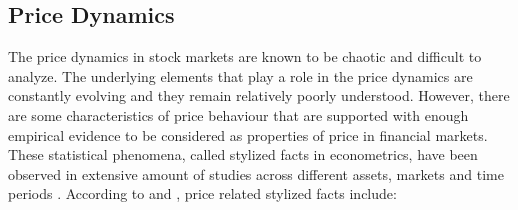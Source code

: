 \subsection{Price Dynamics}
The price dynamics in stock markets are known to be chaotic and difficult to 
analyze. The underlying elements that play a role in the price dynamics
are constantly evolving and they remain relatively poorly understood.
However, there are some characteristics of price behaviour that are supported
with enough empirical evidence to be considered as properties of price in
financial markets. These statistical phenomena, called stylized facts in
econometrics, have been observed in extensive amount of studies across 
different assets, markets and time periods \citep{Shakeel18}. 
According to \citet{StylizedFacts01} and \citet{lob13}, price related stylized
facts include:

